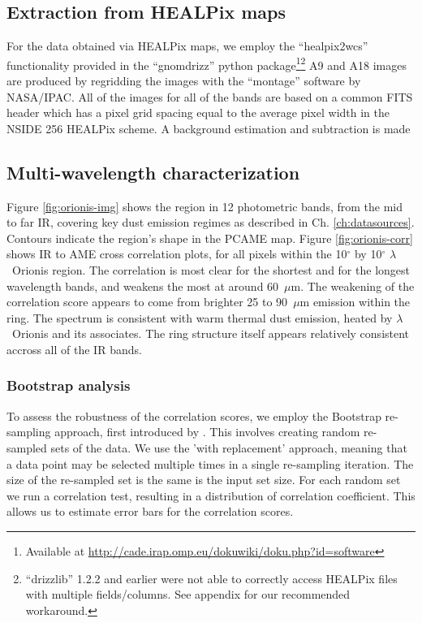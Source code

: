 		\subsection{Extraction from HEALPix maps}
		  For the data obtained via HEALPix maps, we employ the ``healpix2wcs'' functionality provided in the ``gnomdrizz'' python package\footnote{Available at \url{http://cade.irap.omp.eu/dokuwiki/doku.php?id=software}}\footnote{``drizzlib'' 1.2.2 and earlier were not able to correctly access HEALPix files with multiple fields/columns. See appendix for our recommended workaround.} A9 and A18 images are produced by regridding the images with the ``montage'' software by NASA/IPAC. All of the images for all of the bands are based on a common FITS header which has a pixel grid spacing equal to the average pixel width in the NSIDE 256 HEALPix scheme.
      A background estimation and subtraction is made

		\subsection{Multi-wavelength characterization}
			Figure \ref{fig:orionis-img} shows the region in 12 photometric bands, from the mid to far IR, covering key dust emission regimes as described in Ch. \ref{ch:datasources}.
			Contours indicate the region's shape in the PCAME map. Figure \ref{fig:orionis-corr} shows IR to AME cross correlation plots, for all pixels within the 10$^{\circ}$ by 10$^{\circ}$ $\lambda$~Orionis region. The correlation is most clear for the shortest and for the longest wavelength bands, and weakens the most at around 60~$\mu$m. The weakening of the correlation score appears to come from brighter 25 to 90~$\mu$m emission within the ring. The spectrum is consistent with warm thermal dust emission, heated by $\lambda$~Orionis and its associates. The ring structure itself appears relatively consistent accross all of the IR bands.


            \subsubsection{Bootstrap analysis}

            To assess the robustness of the correlation scores, we employ the Bootstrap re-sampling approach, first introduced by \cite{efron79}. This involves creating random re-sampled sets of the data. We use the 'with replacement' approach, meaning that a data point may be selected multiple times in a single re-sampling iteration. The size of the re-sampled set is the same is the input set size. For each random set we run a correlation test, resulting in a distribution of correlation coefficient. This allows us to estimate error bars for the correlation scores.

